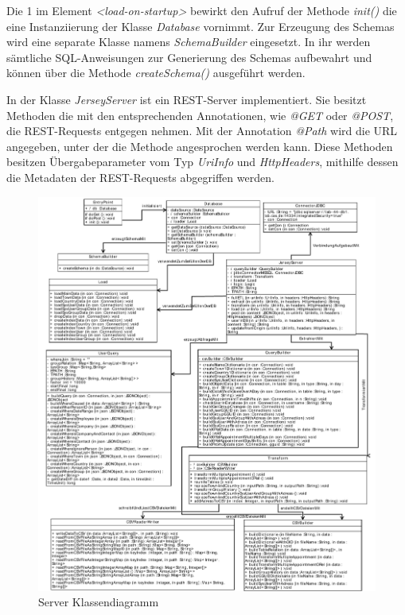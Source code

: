 Die 1 im Element \textit{<load-on-startup>} bewirkt den Aufruf der Methode \textit{init()} die eine Instanziierung der Klasse \textit{Database} vornimmt. Zur Erzeugung des Schemas wird eine separate Klasse namens \textit{SchemaBuilder} eingesetzt. In ihr werden sämtliche SQL-Anweisungen zur Generierung des Schemas aufbewahrt und können über die Methode \textit{createSchema()} ausgeführt werden.

In der Klasse \textit{JerseyServer} ist ein REST-Server implementiert. Sie besitzt Methoden die mit den entsprechenden Annotationen, wie \textit{@GET} oder \textit{@POST}, die REST-Requests entgegen nehmen. Mit der Annotation \textit{@Path} wird die URL angegeben, unter der die Methode angesprochen werden kann. Diese Methoden besitzen Übergabeparameter vom Typ \textit{UriInfo} und \textit{HttpHeaders}, mithilfe dessen die Metadaten der REST-Requests abgegriffen werden. 

\begin{figure}[htbp]
\begin{center}
\includegraphics[width=1.0\textwidth]{pics/ServerKlassendiagramm.pdf}
\caption{Server Klassendiagramm}
\label{umsetzung_klassendiagramm_server}
\end{center}
\end{figure}


